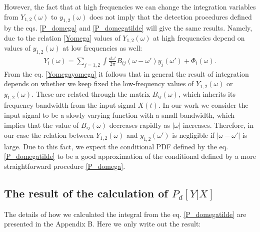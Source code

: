 \documentclass{article}
\begin{document}
However, the fact that at high frequencies we can change the integration variables from $Y_{1,2}(\omega)$ to $y_{1,2}(\omega)$ does not imply that the detection procedures defined by the eqs. \eqref{P_domega} and \eqref{P_domegatilde} will give the same results. Namely, due to the relation \eqref{Yomega} values of $Y_{1,2}(\omega)$ at high frequencies depend on values of $y_{1,2}(\omega)$ at low frequencies as well:
\begin{eqnarray}\label{Yomegayomega}
    Y_{i}(\omega) = \sum_{j=1,2}\int \frac{d\omega'}{2\pi}B_{ij}(\omega-\omega')y_{j}(\omega') + \Phi_{i}(\omega).
\end{eqnarray}
From the eq. \eqref{Yomegayomega} it follows that in general the result of integration depends on whether we keep fixed the low-frequency values of $Y_{1,2}(\omega)$ or $y_{1,2}(\omega)$. These are related through the matrix $B_{ij}(\omega)$, which inherits its frequency bandwidth from the input signal $X(t)$. In our work we consider the input signal to be a slowly varying function with a small bandwidth, which implies that the value of $B_{ij}(\omega)$ decreases rapidly as $|\omega|$ increases. Therefore, in our case the relation between $Y_{1,2}(\omega)$ and $y_{1,2}(\omega')$ is negligible if $|\omega-\omega'|$ is large. Due to this fact, we expect the conditional PDF defined by the eq. \eqref{P_domegatilde} to be a good approximation of the conditional defined by a more straightforward procedure \eqref{P_domega}.




\subsection{The result of the calculation of $P_{d}[Y|X]$}

The details of how we calculated the integral from the eq. \eqref{P_domegatilde} are presented in the Appendix B. Here we only write out the result: 
\end{document}
